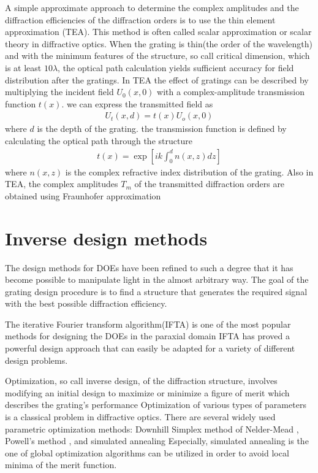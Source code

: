 A simple approximate approach to determine the complex amplitudes and the diffraction efficiencies of the diffraction orders is to use the thin element approximation (TEA)\cite{goodman2005}. This method is often called scalar approximation or scalar theory in diffractive optics. When the grating is thin(the order of the wavelength) and with the minimum features of the structure, so call critical dimension, which is at least $10\lambda$, the optical path calculation yields sufficient accuracy for field distribution after the gratings.%
In TEA the effect of gratings can be described by multiplying the incident field $U_{0}(x,0)$ with a complex-amplitude transmission function $t(x)$.  we can express the transmitted field as
\begin{align}\label{eq:tranmitted}
U_t(x,d)=t(x)U_o(x,0)
\end{align}
where $d$ is the depth of the grating. the transmission function is defined by calculating the optical path through the structure
\begin{align}\label{eq:transmission}
t(x)=\exp \left [ ik\int^d_0 n(x,z) dz \right ]
\end{align}
where $n(x,z)$ is the complex refractive index distribution of the grating. Also in TEA, the complex amplitudes $T_m$ of the transmitted diffraction orders are obtained using Fraunhofer approximation%

\section{Inverse design methods}

The design methods for DOEs have been refined to such a degree that it has become possible to manipulate light in the almost arbitrary way.
The goal of the grating design procedure is to find a structure that generates the required signal with the best possible diffraction efficiency. 

The iterative Fourier transform algorithm(IFTA) is one of the most popular methods for designing the DOEs in the paraxial domain%
IFTA has proved a powerful design approach that can easily be adapted for a variety of different design problems.

Optimization, so call inverse design, of the diffraction structure, involves modifying an initial design to maximize or minimize a figure of merit which describes the grating's performance%
Optimization of various types of parameters is a classical problem in diffractive optics. There are several widely used parametric optimization methods: Downhill Simplex method of Nelder-Mead%
, Powell's method%
, and simulated annealing%
Especially, simulated annealing is the one of global optimization algorithms can be utilized in order to avoid local minima of the merit function.

